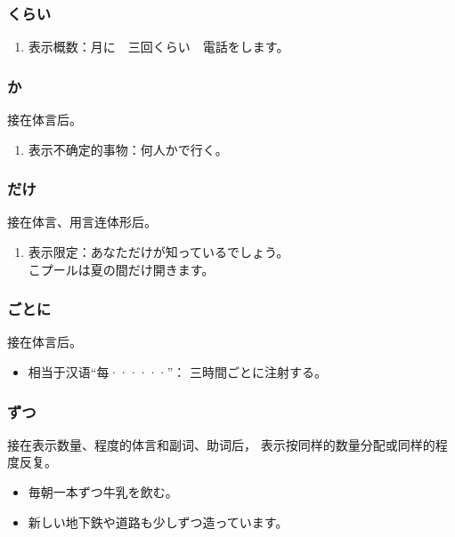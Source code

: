 \subsubsection{くらい}%

\begin{enumerate}
  \item 表示概数：月に　三回くらい　電話をします。
\end{enumerate}


\subsubsection{か}%

接在体言后。
\begin{enumerate}
  \item 表示不确定的事物：何人かで行く。
\end{enumerate}


\subsubsection{だけ}%

接在体言、用言连体形后。
\begin{enumerate}
  \item 表示限定：あなただけが知っているでしょう。\\
    こプールは夏の間だけ開きます。
\end{enumerate}


\subsubsection{ごとに}%

接在体言后。
\begin{itemize}
  \item 相当于汉语``每······''： 三時間ごとに注射する。
\end{itemize}


\subsubsection{ずつ}%

接在表示数量、程度的体言和副词、助词后，
表示按同样的数量分配或同样的程度反复。
\begin{itemize}
  \item 毎朝一本ずつ牛乳を飲む。
  \item 新しい地下鉄や道路も少しずつ造っています。
\end{itemize}


